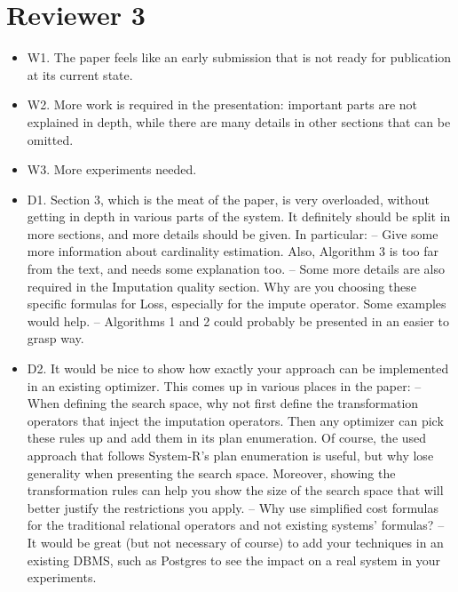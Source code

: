 \documentclass[draft,12pt]{article}
\newcommand{\resp}[1]{{\color{blue}{#1}}}
\begin{document}
\section{Reviewer 3}
\begin{itemize}
\item W1. The paper feels like an early submission that is not ready for publication at its current state.

\item W2. More work is required in the presentation: important parts are not explained in depth, while there are many details in other sections that can be omitted.

\item W3. More experiments needed.

\item D1. Section 3, which is the meat of the paper, is very overloaded, without getting in depth in various parts of the system. It definitely should be split in more sections, and more details should be given. In particular:
-- Give some more information about cardinality estimation. Also, Algorithm 3 is too far from the text, and needs some explanation too.
-- Some more details are also required in the Imputation quality section. Why are you choosing these specific formulas for Loss, especially for the impute operator. Some examples would help.
-- Algorithms 1 and 2 could probably be presented in an easier to grasp way.

\item D2. It would be nice to show how exactly your approach can be implemented in an existing optimizer. This comes up in various places in the paper:
-- When defining the search space, why not first define the transformation operators that inject the imputation operators. Then any optimizer can pick these rules up and add them in its plan enumeration. Of course, the used approach that follows System-R's plan enumeration is useful, but why lose generality when presenting the search space. Moreover, showing the transformation rules can help you show the size of the search space that will better justify the restrictions you apply.
-- Why use simplified cost formulas for the traditional relational operators and not existing systems' formulas?
-- It would be great (but not necessary of course) to add your techniques in an existing DBMS, such as Postgres to see the impact on a real system in your experiments.

\resp{Existing systems have very complex formulas for estimating query costs. We felt that the overhead of reimplementing an existing cost model would not be worth the benefit.}


\end{itemize}
\end{document}
